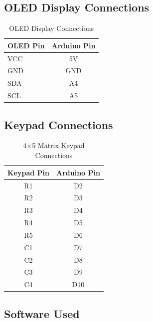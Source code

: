 
\subsection{OLED Display Connections}

\begin{table}[H]
\centering
\caption{OLED Display Connections}
\label{tab:password_oled}

\begin{tabular}{|l|c|}
\hline
\textbf{OLED Pin} & \textbf{Arduino Pin} \\
\hline
VCC & 5V \\
GND & GND \\
SDA & A4 \\
SCL & A5 \\
\hline
\end{tabular}

\end{table}


\subsection{Keypad Connections}

\begin{table}[H]
\centering
\caption{4×5 Matrix Keypad Connections}
\label{tab:password_keypad}

\begin{tabular}{|c|c|}
\hline
\textbf{Keypad Pin} & \textbf{Arduino Pin} \\
\hline
R1 & D2 \\
R2 & D3 \\
R3 & D4 \\
R4 & D5 \\
R5 & D6 \\
C1 & D7 \\
C2 & D8 \\
C3 & D9 \\
C4 & D10 \\
\hline
\end{tabular}

\end{table}


\subsection{Software Used}

